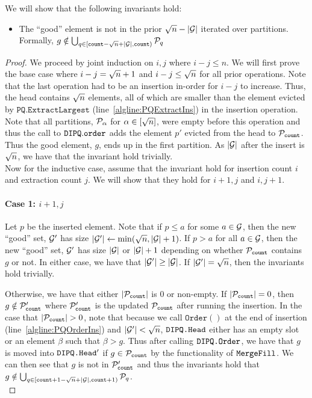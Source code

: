 We will show that the following invariants hold:
\begin{itemize}
	\item The ``good'' element is not in the prior ${\sqrt{n}} - |\mathcal{G}|$ iterated over partitions. Formally, $g \notin \bigcup_{q \in [{\texttt{count}} - {\sqrt{n}} + |\mathcal{G}|, {\texttt{count}})} \mathcal{P}_q$
\end{itemize}

\begin{proof}
We proceed by joint induction on $i, j$ where $i - j \leq n$. 
We will first prove the base case where $i - j = {\sqrt{n}} + 1$ and $i - j \leq {\sqrt{n}}$ for all prior operations.
Note that the last operation had to be an insertion in-order for $i - j$ to increase. Thus, the head contains ${\sqrt{n}}$ elements, all of which are smaller than the element evicted by $\texttt{PQ.ExtractLargest}$ (line~\ref{algline:PQExtractIns}) in the insertion operation.
Note that all partitions, $\mathcal{P}_\alpha$ for $\alpha \in [{\sqrt{n}}]$, were empty before this operation and thus the call to $\texttt{DIPQ}.\texttt{order}$
adds the element $p'$ evicted from the head to $\mathcal{P}_{\texttt{count}}$. Thus the good element, $g$, ends up in the first partition.
As $|\mathcal{G}|$ after the insert is ${\sqrt{n}}$, we have that the invariant hold trivially.\\


Now for the inductive case, assume that the invariant hold for insertion count $i$ and extraction count $j$. We will show that they hold for $i + 1, j$ and $i, j + 1$.
\paragraph*{Case 1: $i + 1, j$}
\label{proof:case1}
Let $p$ be the inserted element. Note that if $p \leq a$ for some $a \in \mathcal{G}$, then the new ``good'' set, 
$\mathcal{G}'$ has size $|\mathcal{G}'| \gets \min({\sqrt{n}}, |\mathcal{G}| + 1)$. If $p > a$ for all $a \in \mathcal{G}$, then the new ``good'' set, $\mathcal{G}'$ has size $|\mathcal{G}|$ or  $|\mathcal{G}| + 1$ depending on whether $\mathcal{P}_{\texttt{count}}$ contains $g$ or not.
In either case, we have that $|\mathcal{G}'| \geq |\mathcal{G}|$. If $|\mathcal{G}'| = {\sqrt{n}}$, then the invariants hold trivially.

Otherwise, we have that either $|\mathcal{P}_{\texttt{count}}|$ is $0$ or non-empty. If  $|\mathcal{P}_{\texttt{count}}| = 0$, then $g \notin \mathcal{P}'_{\texttt{count}}$ where $\mathcal{P}'_{\texttt{count}}$ is the updated $\mathcal{P}_{\texttt{count}}$ after running the insertion.
In the case that $|\mathcal{P}_{\texttt{count}}| > 0$, note that because we call $\texttt{Order}()$ at the end of insertion (line~\ref{algline:PQOrderIns}) and $|\mathcal{G}'| < {\sqrt{n}}$,
$\texttt{DIPQ.Head}$ either has an empty slot or an element $\beta$ such that $\beta > g$. Thus after calling $\texttt{DIPQ.Order}$, we have that $g$ is moved into $\texttt{DIPQ.Head}'$ if $g \in \mathcal{P}_{\texttt{count}}$ by the functionality of $\texttt{MergeFill}$.
We can then see that $g$ is not in $\mathcal{P}'_{\texttt{count}}$ and thus the invariants hold
that $g \notin \bigcup_{q \in [{\texttt{count}} + 1 - {\sqrt{n}} + |\mathcal{G}|, {\texttt{count}} + 1)} \mathcal{P}_q$.\\


\end{proof}
